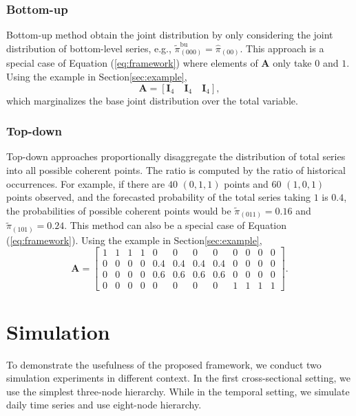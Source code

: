 \documentclass[a4paper,review,12pt,authoryear]{elsarticle}
\begin{document}
   \subsubsection*{Bottom-up}
   \label{sec:bottomup}
   Bottom-up method obtain the joint distribution by only considering the joint distribution of bottom-level series, e.g., $\tilde\pi^{\text{bu}}_{(000)} = \hat\pi_{(00)}$. 
   This approach is a special case of Equation (\ref{eq:framework}) where elements of $\mathbf{A}$ only take $0$ and $1$. 
   Using the example in Section\ref{sec:example},
   \[
    \mathbf{A} = [\mathbf{I}_4\quad \mathbf{I}_4 \quad \mathbf{I}_4 ],
  \]
   which marginalizes the base joint distribution over the total variable.

   \subsubsection*{Top-down}

   Top-down approaches proportionally disaggregate the distribution of total series into all possible coherent points. 
   The ratio is computed by the ratio of historical occurrences.
   For example, if there are $40$ $(0, 1, 1)$ points and $60$ $(1, 0, 1) $ points observed, and the forecasted probability of the total series taking $1$ is $0.4$, the probabilities of possible coherent points would be $\tilde \pi_{(011)} = 0.16$ and $\tilde \pi_{(101)} = 0.24$.
   This method can also be a special case of Equation (\ref{eq:framework}).
   Using the example in Section\ref{sec:example},
   \[
    \mathbf{A} = \left[\begin{matrix}
      1 & 1 & 1 & 1 & 0 & 0 & 0 & 0 & 0 & 0 & 0 & 0 \\
      0 & 0 & 0 & 0 & 0.4 & 0.4 & 0.4 & 0.4 & 0 & 0 & 0 & 0 \\      
      0 & 0 & 0 & 0 & 0.6 & 0.6 & 0.6 & 0.6 & 0 & 0 & 0 & 0 \\
      0 & 0 & 0 & 0 & 0 & 0 & 0 & 0 & 1 & 1 & 1 & 1  
    \end{matrix}\right].
   \]

\section{Simulation}
\label{sec:simulation}
To demonstrate the usefulness of the proposed framework, we conduct two simulation experiments in different context. 
In the first cross-sectional setting, we use the simplest three-node hierarchy. 
While in the temporal setting, we simulate daily time series and use eight-node hierarchy.
\end{document}
